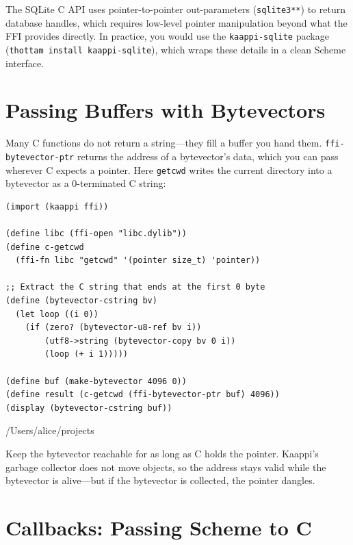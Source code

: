 \begin{note}
The SQLite C API uses pointer-to-pointer out-parameters (\texttt{sqlite3**}) to return database handles, which requires low-level pointer manipulation beyond what the FFI provides directly. In practice, you would use the \texttt{kaappi-sqlite} package (\texttt{thottam install kaappi-sqlite}), which wraps these details in a clean Scheme interface.
\end{note}

\section{Passing Buffers with Bytevectors}

Many C functions do not return a string---they fill a buffer you hand them. \texttt{ffi-bytevector-ptr} returns the address of a bytevector's data, which you can pass wherever C expects a pointer. Here \texttt{getcwd} writes the current directory into a bytevector as a 0-terminated C string:

\begin{lstlisting}
(import (kaappi ffi))

(define libc (ffi-open "libc.dylib"))
(define c-getcwd
  (ffi-fn libc "getcwd" '(pointer size_t) 'pointer))

;; Extract the C string that ends at the first 0 byte
(define (bytevector-cstring bv)
  (let loop ((i 0))
    (if (zero? (bytevector-u8-ref bv i))
        (utf8->string (bytevector-copy bv 0 i))
        (loop (+ i 1)))))

(define buf (make-bytevector 4096 0))
(define result (c-getcwd (ffi-bytevector-ptr buf) 4096))
(display (bytevector-cstring buf))
\end{lstlisting}

\begin{codeoutput}
/Users/alice/projects
\end{codeoutput}

Keep the bytevector reachable for as long as C holds the pointer. Kaappi's garbage collector does not move objects, so the address stays valid while the bytevector is alive---but if the bytevector is collected, the pointer dangles.

\section{Callbacks: Passing Scheme to C}

